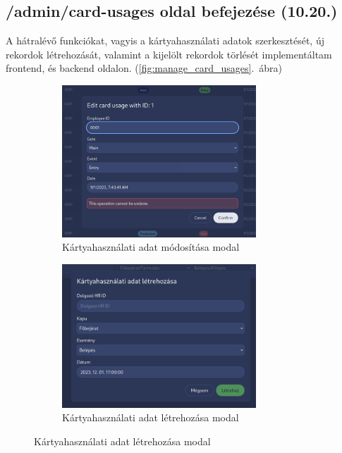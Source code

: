 \documentclass[a4paper]{article}
\begin{document}
\subsection{/admin/card-usages oldal befejezése (10.20.)}

A hátralévő funkciókat, vagyis a kártyahasználati adatok
szerkesztését, új rekordok létrehozását, valamint a kijelölt rekordok
törlését implementáltam frontend, és backend oldalon. (\ref{fig:manage_card_usages}.~ábra)

\begin{figure}[ht]
    \centering
    \begin{subfigure}[b]{0.8\textwidth}
        \centering
        \includegraphics[width=0.8\textwidth]{images/card_usage_modify.png}
        \caption{Kártyahasználati adat módosítása modal}
        \label{fig:card_usage_modify}
    \end{subfigure}

    \vspace{1em} %

    \begin{subfigure}[b]{0.8\textwidth}
        \centering
        \includegraphics[width=0.8\textwidth]{images/create_card_usage.png}
        \caption{Kártyahasználati adat létrehozása modal}
        \label{fig:card_usage_create}
    \end{subfigure}


\end{figure}
\end{document}

